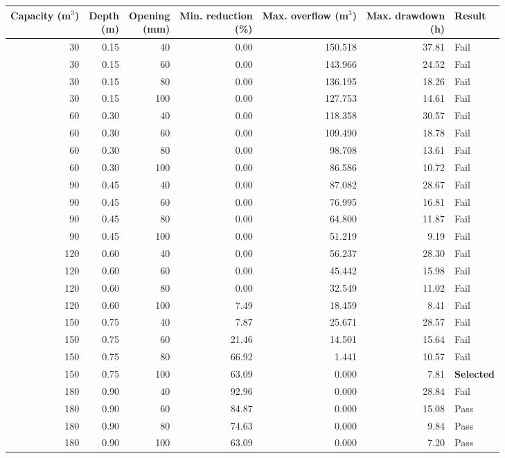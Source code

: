 \begin{tabular}{rrrrrrl}
\toprule
\shortstack{Capacity\\(m$^3$)} & \shortstack{Depth\\(m)} & \shortstack{Opening\\(mm)} & \shortstack{Min. reduction\\(\%)} & \shortstack{Max. overflow\\(m$^3$)} & \shortstack{Max. drawdown\\(h)} & Result \\
\midrule
30 & 0.15 & 40 & 0.00 & 150.518 & 37.81 & Fail \\
30 & 0.15 & 60 & 0.00 & 143.966 & 24.52 & Fail \\
30 & 0.15 & 80 & 0.00 & 136.195 & 18.26 & Fail \\
30 & 0.15 & 100 & 0.00 & 127.753 & 14.61 & Fail \\
60 & 0.30 & 40 & 0.00 & 118.358 & 30.57 & Fail \\
60 & 0.30 & 60 & 0.00 & 109.490 & 18.78 & Fail \\
60 & 0.30 & 80 & 0.00 & 98.708 & 13.61 & Fail \\
60 & 0.30 & 100 & 0.00 & 86.586 & 10.72 & Fail \\
90 & 0.45 & 40 & 0.00 & 87.082 & 28.67 & Fail \\
90 & 0.45 & 60 & 0.00 & 76.995 & 16.81 & Fail \\
90 & 0.45 & 80 & 0.00 & 64.800 & 11.87 & Fail \\
90 & 0.45 & 100 & 0.00 & 51.219 & 9.19 & Fail \\
120 & 0.60 & 40 & 0.00 & 56.237 & 28.30 & Fail \\
120 & 0.60 & 60 & 0.00 & 45.442 & 15.98 & Fail \\
120 & 0.60 & 80 & 0.00 & 32.549 & 11.02 & Fail \\
120 & 0.60 & 100 & 7.49 & 18.459 & 8.41 & Fail \\
150 & 0.75 & 40 & 7.87 & 25.671 & 28.57 & Fail \\
150 & 0.75 & 60 & 21.46 & 14.501 & 15.64 & Fail \\
150 & 0.75 & 80 & 66.92 & 1.441 & 10.57 & Fail \\
150 & 0.75 & 100 & 63.09 & 0.000 & 7.81 & \textbf{Selected} \\
180 & 0.90 & 40 & 92.96 & 0.000 & 28.84 & Fail \\
180 & 0.90 & 60 & 84.87 & 0.000 & 15.08 & Pass \\
180 & 0.90 & 80 & 74.63 & 0.000 & 9.84 & Pass \\
180 & 0.90 & 100 & 63.09 & 0.000 & 7.20 & Pass \\
\bottomrule
\end{tabular}
